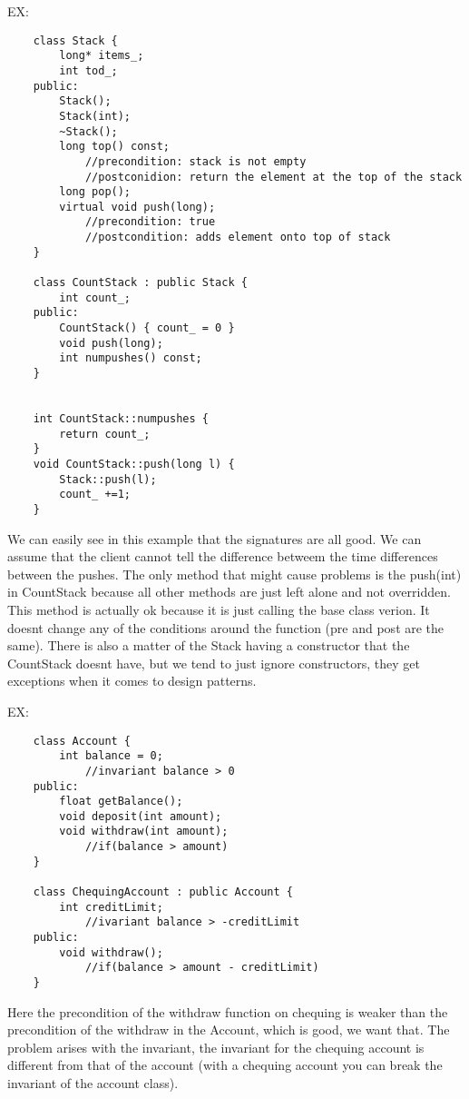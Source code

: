 \documentclass[12pt]{article}
\begin{document}
EX:
\begin{verbatim}
    class Stack {
        long* items_;
        int tod_;
    public:
        Stack();
        Stack(int);
        ~Stack();
        long top() const;
            //precondition: stack is not empty
            //postconidion: return the element at the top of the stack
        long pop();
        virtual void push(long);
            //precondition: true
            //postcondition: adds element onto top of stack
    }

    class CountStack : public Stack {
        int count_;
    public:
        CountStack() { count_ = 0 }
        void push(long);
        int numpushes() const;
    }


    int CountStack::numpushes {
        return count_;
    }
    void CountStack::push(long l) {
        Stack::push(l);
        count_ +=1;
    }
\end{verbatim}

We can easily see in this example that the signatures are all good. We can assume that the client cannot tell the difference betweem the time differences between the pushes. The only method that might cause problems is the push(int) in CountStack because all other methods are just left alone and not overridden. This method is actually ok because it is just calling the base class verion. It doesnt change any of the conditions around the function (pre and post are the same). There is also a matter of the Stack having a constructor that the CountStack doesnt have, but we tend to just ignore constructors, they get exceptions when it comes to design patterns.

EX:
\begin{verbatim}
    class Account {
        int balance = 0;
            //invariant balance > 0
    public:
        float getBalance();
        void deposit(int amount);
        void withdraw(int amount);
            //if(balance > amount)
    }

    class ChequingAccount : public Account {
        int creditLimit;
            //ivariant balance > -creditLimit
    public:
        void withdraw();
            //if(balance > amount - creditLimit)
    }
\end{verbatim}

Here the precondition of the withdraw function on chequing is weaker than the precondition of the withdraw in the Account, which is good, we want that. The problem arises with the invariant, the invariant for the chequing account is different from that of the account (with a chequing account you can break the invariant of the account class).
\end{document}
